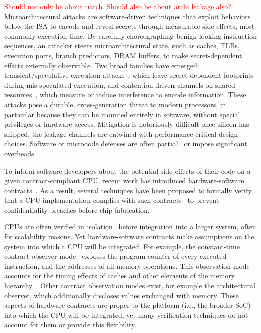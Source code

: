 
\textcolor{red}{Should not only be about uarch. Should also be about archi leakage also?}
Microarchitectural attacks are software-driven techniques that exploit behaviors below the ISA to encode and reveal secrets through measurable side effects, most commonly execution time.
By carefully choreographing benign-looking instruction sequences, an attacker steers microarchitectural state, such as caches, TLBs, execution ports, branch predictors, DRAM buffers, to make secret-dependent effects externally observable.
Two broad families have emerged: transient/speculative-execution attacks~\cite{kocher2019spectre,lipp2018meltdown,canella2019fallout,schwarz2019zombieload,van2019ridl,van2021cacheout,ragab2021rage,wikner2022retbleed,trujillo2023inception,wikner2023phantom,wikner2024breaking,wikner2025bpi}, which leave secret-dependent footprints during mis-speculated execution, and contention-driven channels on shared resources~\cite{bernstein2005cache,Liu2015LLC,YaromFalkner2014FlushReload,Yarom2016CacheBleed,Moghimi2018MemJam,Gruss2016PrefetchSCA,Pessl2016DRAMA}, which measure or induce interference to encode information.
These attacks pose a durable, cross-generation threat to modern processors, in particular because they can be mounted entirely in software, without special privileges or hardware access.
Mitigation is notoriously difficult once silicon has shipped: the leakage channels are entwined with performance-critical design choices.
Software or microcode defenses are often partial~\cite{ridlad} or impose significant overheads.

To inform software developers about the potential side effects of their code on a given contract-compliant CPU, recent work has introduced hardware-software contracts~\cite{guarnieri2021hardware,oleksenko2022revizor}.
As a result, several techniques have been proposed to formally verify that a CPU implementation complies with such contracts~\cite{dinesh2024conjunct,dinesh2025h,ceesay2024mucfi,wang2023specification,tan2025contractshadowlogic,hsiao2024rtl2mmupath} to prevent confidentiality breaches before chip fabrication.

CPUs are often verified in isolation~\cite{dinesh2024conjunct,dinesh2025h,ceesay2024mucfi,wang2023specification,tan2025contractshadowlogic,hsiao2024rtl2mmupath} before integration into a larger system, often for scalability reasons.
Yet hardware-software contracts make assumptions on the system into which a CPU will be integrated.
For example, the constant-time contract observer mode~\cite{guarnieri2021hardware} exposes the program counter of every executed instruction, and the addresses of all memory operations.
This observation mode accounts for the timing effects of caches and other elements of the memory hierarchy~\cite{guarnieri2021hardware,oleksenko2022revizor}.
Other contract observation modes exist, for example the architectural observer, which additionally discloses values exchanged with memory.
These aspects of hardware-contracts are proper to the platform (i.e., the broader SoC) into which the CPU will be integrated, yet many verification techniques do not account for them or provide this flexibility.

